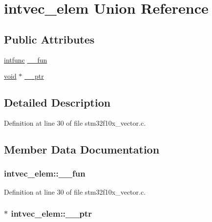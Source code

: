 \hypertarget{unionintvec__elem}{}\section{intvec\+\_\+elem Union Reference}
\label{unionintvec__elem}
\subsection*{Public Attributes}
\begin{DoxyCompactItemize}
\item 
\hyperlink{openmotestm_2ewarm_2stm32f10x__vector_8c_adf545163e792cf966392481f761ce069}{intfunc} \hyperlink{unionintvec__elem_a9d5729b37c61a2d2b99b4f9d9161018c}{\+\_\+\+\_\+fun}
\item 
\hyperlink{usb__devapi_8h_afabf60e7f57651d6d595a02c75f07cd0}{void} $\ast$ \hyperlink{unionintvec__elem_adec06ece7e6d9ee4df90d4b22912508e}{\+\_\+\+\_\+ptr}
\end{DoxyCompactItemize}


\subsection{Detailed Description}


Definition at line 30 of file stm32f10x\+\_\+vector.\+c.



\subsection{Member Data Documentation}
\subsubsection[{\texorpdfstring{\+\_\+\+\_\+fun}{__fun}}]{ intvec\+\_\+elem\+::\+\_\+\+\_\+fun}\hypertarget{unionintvec__elem_a9d5729b37c61a2d2b99b4f9d9161018c}{}\label{unionintvec__elem_a9d5729b37c61a2d2b99b4f9d9161018c}


Definition at line 30 of file stm32f10x\+\_\+vector.\+c.

\subsubsection[{\texorpdfstring{\+\_\+\+\_\+ptr}{__ptr}}]{ $\ast$ intvec\+\_\+elem\+::\+\_\+\+\_\+ptr}\hypertarget{unionintvec__elem_adec06ece7e6d9ee4df90d4b22912508e}{}\label{unionintvec__elem_adec06ece7e6d9ee4df90d4b22912508e}


